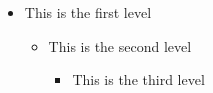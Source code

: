 \documentclass{article}
\begin{document}
\begin{itemize}
	\item This is the first level
	\begin{itemize}
		\item This is the second level
		\begin{itemize}
			\item This is the third level
		\end{itemize}
	\end{itemize}
\end{itemize}
\end{document}
